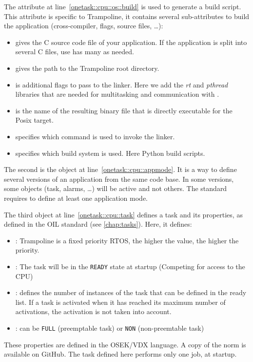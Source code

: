 The  attribute at line~\ref{onetask::cpu::os::build} is used to generate a build script. This attribute is specific to Trampoline, it contains several sub-attributes to build the application (cross-compiler, flags, source files, …):
\begin{itemize}
\item {} gives the C source code file of your application. If the application is split into several C files, use has many  as needed.
\item {} gives the path to the Trampoline root directory.
\item {} is additional flags to pass to the linker. Here we add the \emph{rt} and \emph{pthread} libraries that are needed for multitasking and communication with . 
\item {} is the name of the resulting binary file that is directly executable for the Posix target.
\item {} specifies which command is used to invoke the linker.
\item {} specifies which build system is used. Here Python build scripts.
\end{itemize}

The second is the object  at line~\ref{onetask::cpu::appmode}. It is a way to define several versions of an application from the same code base. In some versions, some objects (task, alarms, …) will be active and not others. The standard requires to define at least one application mode.

The third object  at line~\ref{onetask::cpu::task} defines a task and its properties, as defined in the OIL standard (see \ref{chap:tasks}). Here, it defines: 
\begin{itemize}
  \item {}: Trampoline is a fixed priority RTOS, the higher the value, the higher the priority.
  \item {}: The task will be in the \texttt{READY} state at startup (Competing for access to the CPU)
  \item {}: defines the number of instances of the task that can be defined in the ready list. If a task is activated when it has reached its maximum number of activations, the activation is not taken into account.
  \item {}: can be \texttt{FULL} (preemptable task) or \texttt{NON} (non-preemtable task)
\end{itemize}
These properties are defined in the OSEK/VDX language. A copy of the norm is available on GitHub.
The task defined here performs only one job, at startup.

